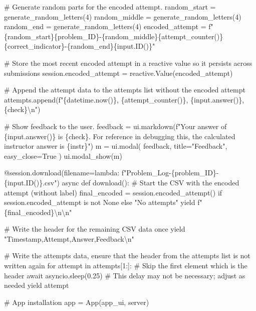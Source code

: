 \documentclass[
  letterpaper,
  DIV=11,
  numbers=noendperiod]{scrreprt}
\newenvironment{Shaded}{\begin{snugshade}}{\end{snugshade}}
\newcommand{\NormalTok}[1]{\textcolor[rgb]{0.00,0.23,0.31}{#1}}
\begin{document}
\begin{Shaded}
\begin{Highlighting}[]
\NormalTok{        \# Generate random parts for the encoded attempt.}
\NormalTok{        random\_start = generate\_random\_letters(4)}
\NormalTok{        random\_middle = generate\_random\_letters(4)}
\NormalTok{        random\_end = generate\_random\_letters(4)}
\NormalTok{        encoded\_attempt = f"\{random\_start\}\{problem\_ID\}{-}\{random\_middle\}\{attempt\_counter()\}\{correct\_indicator\}{-}\{random\_end\}\{input.ID()\}"}

\NormalTok{        \# Store the most recent encoded attempt in a reactive value so it persists across submissions}
\NormalTok{        session.encoded\_attempt = reactive.Value(encoded\_attempt)}

\NormalTok{        \# Append the attempt data to the attempts list without the encoded attempt}
\NormalTok{        attempts.append(f"\{datetime.now()\}, \{attempt\_counter()\}, \{input.answer()\}, \{check\}\textbackslash{}n")}

\NormalTok{        \# Show feedback to the user.}
\NormalTok{        feedback = ui.markdown(f"Your answer of \{input.answer()\} is \{check\}. For reference in debugging this, the calculated instructor answer is \{instr\}")}
\NormalTok{        m = ui.modal(}
\NormalTok{            feedback,}
\NormalTok{            title="Feedback",}
\NormalTok{            easy\_close=True}
\NormalTok{        )}
\NormalTok{        ui.modal\_show(m)}

\NormalTok{    @session.download(filename=lambda: f"Problem\_Log{-}\{problem\_ID\}{-}\{input.ID()\}.csv")}
\NormalTok{    async def download():}
\NormalTok{        \# Start the CSV with the encoded attempt (without label)}
\NormalTok{        final\_encoded = session.encoded\_attempt() if session.encoded\_attempt is not None else "No attempts"}
\NormalTok{        yield f"\{final\_encoded\}\textbackslash{}n\textbackslash{}n"}
        
\NormalTok{        \# Write the header for the remaining CSV data once}
\NormalTok{        yield "Timestamp,Attempt,Answer,Feedback\textbackslash{}n"}
        
\NormalTok{        \# Write the attempts data, ensure that the header from the attempts list is not written again}
\NormalTok{        for attempt in attempts[1:]:  \# Skip the first element which is the header}
\NormalTok{            await asyncio.sleep(0.25)  \# This delay may not be necessary; adjust as needed}
\NormalTok{            yield attempt}


\NormalTok{\# App installation}
\NormalTok{app = App(app\_ui, server)}
\end{Highlighting}
\end{Shaded}
\end{document}
